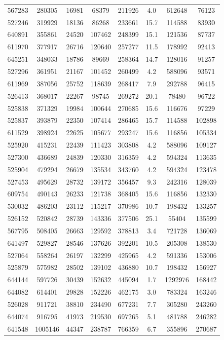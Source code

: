 \documentclass[DM,lsstdraft,toc,usenatbib]{lsstdoc}
\begin{document}
\begin{table}
\begin{tabular}{cccccccc}
567283 & 280305 & 16981 & 68379 & 211926 & 4.0 & 612648 & 76123 \\
527246 & 319929 & 18136 & 86268 & 233661 & 15.7 & 114588 & 83930 \\
640891 & 355861 & 24520 & 107462 & 248399 & 15.1 & 121536 & 87737 \\
611970 & 377917 & 26716 & 120640 & 257277 & 11.5 & 178992 & 92413 \\
645251 & 348033 & 18786 & 89669 & 258364 & 14.7 & 128016 & 91257 \\
527296 & 361951 & 21167 & 101452 & 260499 & 4.2 & 588096 & 93571 \\
611969 & 387056 & 25752 & 118639 & 268417 & 7.9 & 292788 & 96415 \\
526413 & 368017 & 22267 & 98745 & 269272 & 20.1 & 78480 & 96722 \\
525838 & 371329 & 19984 & 100644 & 270685 & 15.6 & 116676 & 97229 \\
525837 & 393879 & 22350 & 107414 & 286465 & 15.7 & 114588 & 102898 \\
611529 & 398924 & 22625 & 105677 & 293247 & 15.6 & 116856 & 105334 \\
525920 & 415231 & 22439 & 111423 & 303808 & 4.2 & 588096 & 109127 \\
527300 & 436689 & 24839 & 120330 & 316359 & 4.2 & 594324 & 113635 \\
525904 & 479294 & 26679 & 135534 & 343760 & 4.2 & 594324 & 123478 \\
527453 & 495629 & 28732 & 139172 & 356457 & 9.3 & 242316 & 128039 \\
609754 & 490143 & 26233 & 121738 & 368405 & 15.6 & 116856 & 132330 \\
530032 & 486203 & 23112 & 115217 & 370986 & 10.7 & 198432 & 133257 \\
526152 & 520842 & 28739 & 143336 & 377506 & 25.1 & 55404 & 135599 \\
567795 & 508405 & 26663 & 129592 & 378813 & 3.4 & 721728 & 136069 \\
641497 & 529827 & 28546 & 137626 & 392201 & 10.5 & 205308 & 138530 \\
527064 & 558264 & 26197 & 132299 & 425965 & 4.2 & 591336 & 153006 \\
525879 & 575982 & 28502 & 139102 & 436880 & 10.7 & 198432 & 156927 \\
644144 & 597726 & 30439 & 152632 & 445094 & 1.7 & 1292976 & 168442 \\
644082 & 614401 & 29828 & 152226 & 462175 & 3.0 & 783324 & 163246 \\
526028 & 911721 & 38810 & 234490 & 677231 & 7.7 & 305280 & 243260 \\
644074 & 916795 & 41973 & 219530 & 697265 & 5.1 & 481788 & 246282 \\
641548 & 1005146 & 44347 & 238787 & 766359 & 6.7 & 355896 & 270687 \\
\hline
\end{tabular}
\end{table}
\end{document}
